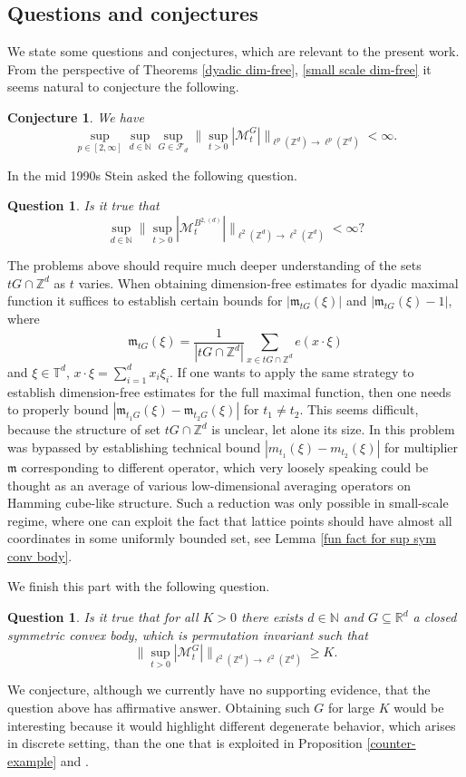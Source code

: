 \documentclass[10pt,a4paper]{amsart}
\numberwithin{equation}{section}
\newtheorem{Conj}[Thm]{Conjecture}
\newtheorem{Que}[Thm]{Question}
\newcommand{\Z}{\mathbb{Z}}
\newcommand{\R}{\mathbb{R}}
\newcommand{\N}{\mathbb{N}}
\newcommand{\T}{\mathbb{T}}
\begin{document}
\subsection{Questions and conjectures}
We state some questions and conjectures, which are relevant to the present work.
From the perspective of Theorems \ref{dyadic dim-free}, \ref{small scale dim-free} it seems natural to conjecture the following.
\begin{Conj}\label{dim free conjecture}
    We have 
 \[
 \sup_{p \in [2,\infty]} \sup_{d \in \N} \sup_{G \in \mathcal{F}_d} \Big\| \sup_{t>0} |\mathcal{M}_{t}^G| \Big\|_{\ell^p(\Z^d) \to \ell^p(\Z^d)}< \infty.
 \] 
\end{Conj}
In the mid 1990s Stein asked the following question.
\begin{Que}
    Is it true that 
    \[
    \sup_{d \in \N}  \Big\| \sup_{t>0} |\mathcal{M}_{t}^{B^{2,(d)}}| \Big\|_{\ell^2(\Z^d) \to \ell^2(\Z^d)}< \infty ?
    \]
\end{Que}
The problems above should require much deeper understanding of the sets $tG \cap \Z^d$ as $t$ varies. When obtaining dimension-free estimates for dyadic maximal function it suffices to establish certain bounds for $|\mathfrak{m}_{tG}(\xi)|$ and $|\mathfrak{m}_{tG}(\xi)-1|$, where 
\[
\mathfrak{m}_{tG}(\xi)= \frac{1}{|tG \cap \Z^d|} \sum_{x \in tG \cap \Z^d} e(x \cdot \xi)
\]
and $\xi \in \T^d$, $x \cdot \xi= \sum_{i=1}^d x_i \xi_i$. If one wants to apply the same strategy to establish dimension-free estimates for the full maximal function, then one needs to properly bound $|\mathfrak{m}_{t_1G}(\xi)-\mathfrak{m}_{t_2G}(\xi)|$ for $t_1 \neq t_2$. This seems difficult, because the structure of set $t G \cap \Z^d$ is unclear, let alone its size. In \cite{NW} this problem was bypassed by establishing technical bound $|m_{t_1}(\xi)-m_{t_2}(\xi)|$ for multiplier $\mathfrak{m}$ corresponding to different operator, which very loosely speaking could be thought as an average of various low-dimensional averaging operators on Hamming cube-like structure. Such a reduction was only possible in small-scale regime, where one can exploit the fact that lattice points should have almost all coordinates in some uniformly bounded set, see Lemma \ref{fun fact for sup sym conv body}.
\par We finish this part with the following question.
\begin{Que}
    Is it true that for all $K>0$ there exists $d \in \N$ and $G \subseteq \R^d$ a closed symmetric convex body, which is permutation invariant such that 
    \[
    \Big\| \sup_{t>0} |\mathcal{M}_t^G| \Big\|_{\ell^2(\Z^d) \to \ell^2(\Z^d)} \ge K.
    \]
\end{Que}
We conjecture, although we currently have no supporting evidence, that the question above has affirmative answer. Obtaining such $G$ for large $K$ would be interesting because it would highlight different degenerate behavior, which arises in discrete setting, than the one that is exploited in Proposition \ref{counter-example} and \cite[Theorem 2]{cubes}.
\end{document}
